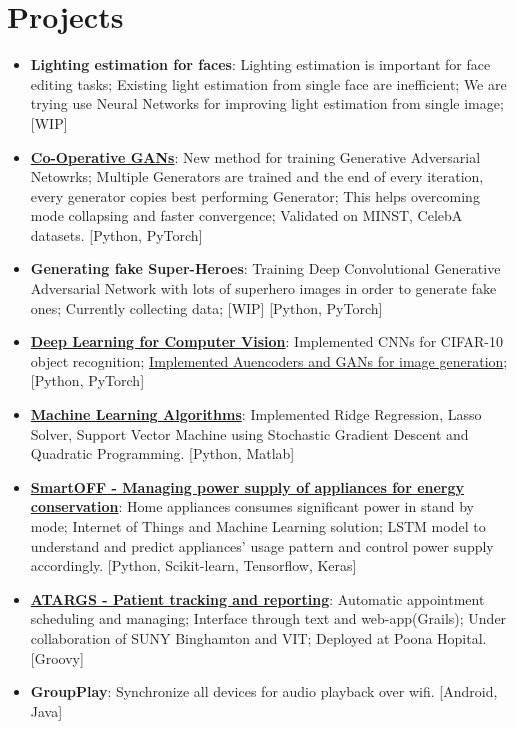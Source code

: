 \documentclass[letterpaper,11pt]{article}
\newcommand{\resumeItem}[2]{
  \item\small{
    \textbf{#1}{: #2 \vspace{-2pt}}
  }
}
\newcommand{\resumeSubItem}[2]{\resumeItem{#1}{#2}\vspace{-4pt}}
\newcommand{\resumeSubHeadingListStart}{\begin{itemize}[leftmargin=*]}
\newcommand{\resumeSubHeadingListEnd}{\end{itemize}}
\begin{document}
\section{Projects}
  \resumeSubHeadingListStart
    \resumeSubItem{Lighting estimation for faces}
    {Lighting estimation is important for face editing tasks; Existing light estimation from single face are inefficient; We are trying use Neural Networks for improving light estimation from single image; [WIP]}
    \resumeSubItem{\href{https://github.com/bhushan23/GAN/tree/master/Co-Operative-GAN}{Co-Operative GANs}}{New method for training Generative Adversarial Netowrks; Multiple Generators are trained and the end of every iteration, every generator copies best performing Generator; This helps overcoming mode collapsing and faster convergence; Validated on MINST, CelebA datasets. [Python, PyTorch]}
    \resumeSubItem{Generating fake Super-Heroes}{Training Deep Convolutional Generative Adversarial Network with lots of superhero images in order to generate fake ones; Currently collecting data; [WIP] [Python, PyTorch]}
    \resumeSubItem{\href{https://github.com/bhushan23/Computer-Vision}{Deep Learning for Computer Vision}}{Implemented CNNs for CIFAR-10 object recognition; \href{https://github.com/bhushan23/GAN/}{Implemented Auencoders and GANs for image generation}; [Python, PyTorch]}
    \resumeSubItem{\href{https://github.com/bhushan23/SBU-ML-Assignment}{Machine Learning Algorithms}}{Implemented Ridge Regression, Lasso Solver, Support Vector Machine using Stochastic Gradient Descent and Quadratic Programming. [Python, Matlab]}
    \resumeSubItem{\href{https://github.com/bhushan23/SmartOff}{SmartOFF - Managing power supply of appliances for energy conservation}}
    {Home appliances consumes significant power in stand by mode; Internet of Things and Machine Learning solution; LSTM model to understand and predict appliances' usage pattern and control power supply accordingly. [Python, Scikit-learn, Tensorflow, Keras]}
    \resumeSubItem{\href{https://github.com/bhushan23/ATARGS3}{ATARGS - Patient tracking and reporting}}{Automatic appointment scheduling and managing; Interface through text and web-app(Grails); Under collaboration of SUNY Binghamton and VIT; Deployed at Poona Hopital. [Groovy]}
      \resumeSubItem{GroupPlay}
      {Synchronize all devices for audio playback over wifi. [Android, Java]}
  \resumeSubHeadingListEnd
\end{document}
